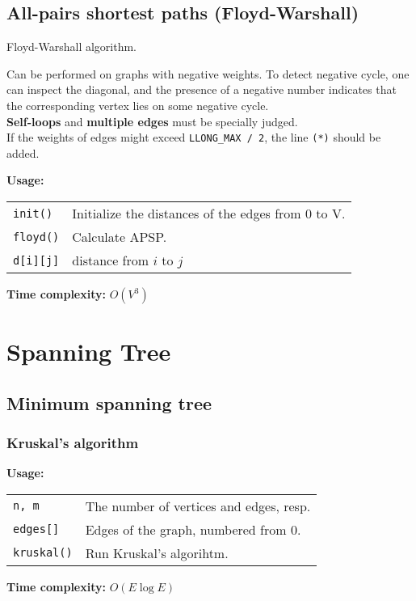 \subsection{All-pairs shortest paths (Floyd-Warshall)}
Floyd-Warshall algorithm. \par
\Tick Can be performed on graphs with negative weights. To detect negative cycle, one can inspect the diagonal, and the presence of a negative number indicates that the corresponding vertex lies on some negative cycle. \\
\Warning \textbf{Self-loops} and \textbf{multiple edges} must be specially judged. \\
\Warning If the weights of edges might exceed \lstinline|LLONG_MAX / 2|, the line \lstinline|(*)| should be added. \par
\textbf{Usage:} \\[0.1cm]
\begin{tabular}{p{2.5cm} p{9cm}}
  \lstinline|init()| & Initialize the distances of the edges from 0 to V.  \\
  \lstinline|floyd()| & Calculate APSP. \\
  \lstinline|d[i][j]| & distance from $i$ to $j$ \\
\end{tabular} \par
\textbf{Time complexity:} $O(V^3)$ \par


\section{Spanning Tree}
\subsection{Minimum spanning tree}
\subsubsection{Kruskal's algorithm}
\textbf{Usage:} \\[0.1cm]
\begin{tabular}{p{2.5cm} p{9cm}}
  \lstinline|n, m| & The number of vertices and edges, resp. \\
  \lstinline|edges[]| & Edges of the graph, numbered from 0. \\
  \lstinline|kruskal()| & Run Kruskal's algorihtm. \\
\end{tabular} \par
\textbf{Time complexity:} $O(E \log E)$ \par


